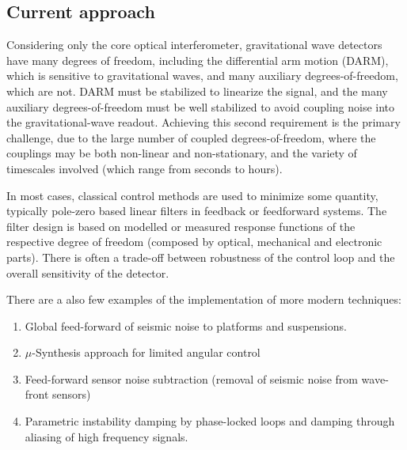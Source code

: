 \subsection{Current approach}
Considering only the core optical interferometer, gravitational wave detectors have many degrees of freedom,  including the differential arm motion (DARM), which is sensitive to gravitational waves, and many auxiliary degrees-of-freedom, which are not. DARM must be stabilized to linearize the signal, and the many auxiliary degrees-of-freedom must be well stabilized to avoid coupling noise into the gravitational-wave readout. Achieving this second requirement is the primary challenge, due to the large number of coupled degrees-of-freedom, where the couplings may be both non-linear and non-stationary, and the variety of timescales involved (which range from seconds to hours).

In most cases, classical control methods are used to minimize some quantity, typically pole-zero based linear filters in feedback or feedforward systems.
The filter design is based on modelled or measured response functions of the respective degree of freedom (composed by optical, mechanical and electronic parts). There is often a trade-off between robustness of the control loop and the overall sensitivity of the detector.

There are a also few examples of the implementation of more modern techniques:
\begin{enumerate}
\item  Global feed-forward of seismic noise to platforms and suspensions.
\item  $\mu$-Synthesis approach for limited angular control
\item  Feed-forward sensor noise subtraction (removal of seismic noise from wave-front sensors)
\item  Parametric instability damping by phase-locked loops and damping through aliasing of high frequency signals.
\end{enumerate}

